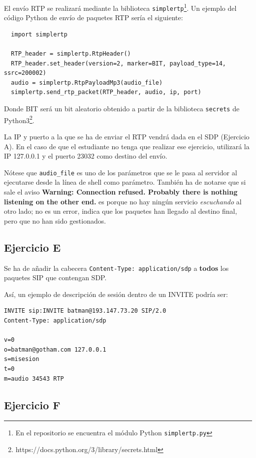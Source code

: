 \documentclass[a4paper,11pt]{article}
\begin{document}
El envío RTP se realizará mediante la biblioteca \texttt{simplertp}\footnote{En el repositorio se encuentra el módulo Python \texttt{simplertp.py}}. Un ejemplo del código Python de envío de paquetes RTP sería el siguiente:

\begin{verbatim}
  import simplertp

  RTP_header = simplertp.RtpHeader()
  RTP_header.set_header(version=2, marker=BIT, payload_type=14, ssrc=200002)
  audio = simplertp.RtpPayloadMp3(audio_file)
  simplertp.send_rtp_packet(RTP_header, audio, ip, port)
\end{verbatim}

Donde BIT será un bit aleatorio obtenido a partir de la biblioteca \texttt{secrets} de Python3\footnote{https://docs.python.org/3/library/secrets.html}.

La IP y puerto a la que se ha de enviar el RTP vendrá dada en el SDP (Ejercicio A). En el caso de que el estudiante no tenga que realizar ese ejercicio, utilizará la IP 127.0.0.1 y el puerto 23032 como destino del envío.

Nótese que \texttt{audio\_file} es uno de los parámetros que se le pasa al servidor al ejecutarse desde la línea de shell como parámetro. También ha de notarse que si sale el aviso {\bf Warning: Connection refused. Probably there is nothing listening on the other end.} es porque no hay ningún servicio \emph{escuchando} al otro lado; no es un error, indica que los paquetes han llegado al destino final, pero que no han sido gestionados.


\subsection*{Ejercicio E}

Se ha de añadir la cabecera \texttt{Content-Type: application/sdp} a {\bf todos} los paquetes SIP que contengan SDP.

Así, un ejemplo de descripción de sesión dentro de un INVITE podría ser:

\begin{verbatim}
INVITE sip:INVITE batman@193.147.73.20 SIP/2.0
Content-Type: application/sdp

v=0
o=batman@gotham.com 127.0.0.1
s=misesion
t=0
m=audio 34543 RTP
\end{verbatim}


\subsection*{Ejercicio F}
\end{document}
